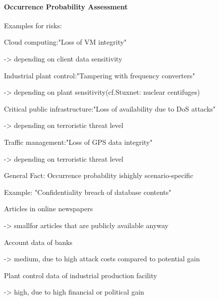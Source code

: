 \documentclass[a4paper]{article}
\begin{document}
\begin{multicols}{3}
    \paragraph{Occurrence Probability Assessment}
    Examples for risks:
    \begin{itemize*}
        \item Cloud computing:"Loss of VM integrity"
              \begin{itemize*}
                  \item ->  depending on client data sensitivity
              \end{itemize*}
        \item Industrial plant control:"Tampering with frequency converters"
              \begin{itemize*}
                  \item ->  depending on plant sensitivity(cf.Stuxnet: nuclear centifuges)
              \end{itemize*}
        \item Critical public infrastructure:"Loss of availability due to DoS attacks"
              \begin{itemize*}
                  \item ->  depending on terroristic threat level
              \end{itemize*}
        \item Traffic management:"Loss of GPS data integrity"
              \begin{itemize*}
                  \item ->  depending on terroristic threat level
              \end{itemize*}
    \end{itemize*}

    General Fact: Occurrence probability ishighly scenario-specific

    Example: "Confidentiality breach of database contents"
    \begin{itemize*}
        \item Articles in online newspapers
              \begin{itemize*}
                  \item -> smallfor articles that are publicly available anyway
              \end{itemize*}
        \item Account data of banks
              \begin{itemize*}
                  \item -> medium, due to high attack costs compared to potential gain
              \end{itemize*}
        \item Plant control data of industrial production facility
              \begin{itemize*}
                  \item -> high, due to high financial or political gain
              \end{itemize*}
    \end{itemize*}


\end{multicols}
\end{document}
